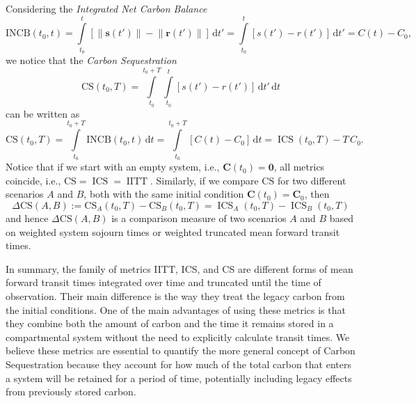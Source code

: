 \documentclass[9pt,twoside,lineno]{pnas-new_SI}
\newcommand{\CS}{\mathrm{CS}}
\newcommand{\INCB}{\mathrm{INCB}}
\newcommand{\IITT}{\operatorname{IITT}}
\newcommand{\ICS}{\operatorname{ICS}}
\newcommand{\intl}{\int\limits}
\newcommand{\dd}[1]{\,\mathrm{d}#1}
\renewcommand{\vec}[1]{\mathbf{#1}}
\newcommand{\vnorm}[1]{\left\|#1\right\|}
\begin{document}
Considering the \emph{Integrated Net Carbon Balance}
\begin{equation}
    \INCB(t_0,t) = \intl_{t_0}^{t}\left[\vnorm{\vec{s}(t')}-\vnorm{\vec{r}(t')}\right]\dd{t'} = \intl_{t_0}^t \left[s(t')-r(t')\right]\dd{t'} = C(t)-C_0,
\end{equation}
we notice that the \emph{Carbon Sequestration}
\begin{equation}
    \CS(t_0,T) = \intl_{t_0}^{t_0+T} \intl_{t_0}^t \left[s(t')-r(t')\right]\dd{t'}\dd{t}
\end{equation}
can be written as
\begin{equation}
    \CS(t_0,T) = \intl_{t_0}^{t_0+T} \INCB(t_0,t)\dd{t} = \intl_{t_0}^{t_0+T} \left[C(t) - C_0\right]\dd{t} = \ICS(t_0,T) - T\,C_0.
\end{equation}
Notice that if we start with an empty system, i.e., $\vec{C}(t_0) = \vec{0}$, all metrics coincide, i.e.,  $\CS = \ICS = \IITT$. 
Similarly, if we compare $\CS$ for two different scenarios $A$ and $B$, both with the same initial condition $\vec{C}(t_0)=\vec{C}_0$, then
\begin{equation}
    \label{eqn:Delta_CS}
    \Delta\CS(A,B) := \CS_A(t_0,T) - \CS_B(t_0,T) = \ICS_A(t_0,T) - \ICS_B(t_0,T)
\end{equation}
and hence $\Delta\CS(A,B)$ is a comparison measure of two scenarios $A$ and $B$ based on weighted system sojourn times or weighted truncated mean forward transit times.

In summary, the family of metrics IITT, ICS, and CS are different forms of mean forward transit times integrated over time and truncated until the time of observation. Their main difference is the way they treat the legacy carbon from the initial conditions. One of the main advantages of using these metrics is that they combine both the amount of carbon and the time it remains stored in a compartmental system without the need to explicitly calculate transit times. We believe these metrics are essential to quantify the more general concept of Carbon Sequestration because they account for how much of the total carbon that enters a system will be retained for a period of time, potentially including legacy effects from previously stored carbon. 
\end{document}
